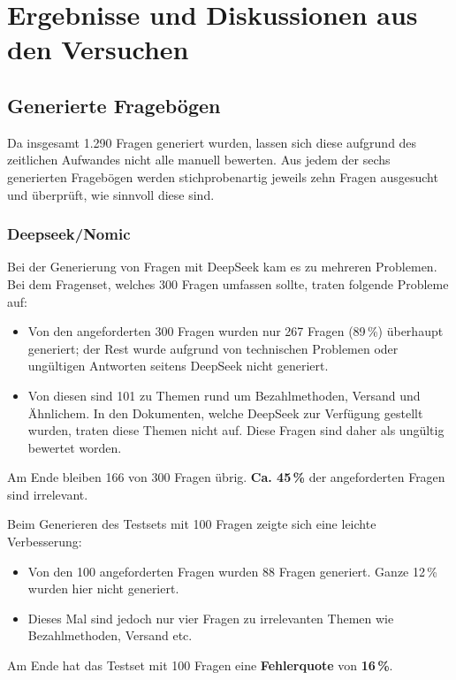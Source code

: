 \chapter{Ergebnisse und Diskussionen aus den Versuchen}



\section{Generierte Fragebögen}
Da insgesamt 1.290 Fragen generiert wurden, lassen sich diese aufgrund des zeitlichen Aufwandes nicht alle manuell bewerten. Aus jedem der sechs generierten Fragebögen werden stichprobenartig jeweils zehn Fragen ausgesucht und überprüft, wie sinnvoll diese sind.

\subsection{Deepseek/Nomic}

Bei der Generierung von Fragen mit DeepSeek kam es zu mehreren Problemen.
Bei dem Fragenset, welches 300 Fragen umfassen sollte, traten folgende Probleme auf:
\begin{itemize}
    \item Von den angeforderten 300 Fragen wurden nur 267 Fragen (89\,\%) überhaupt generiert; der Rest wurde aufgrund von technischen Problemen oder ungültigen Antworten seitens DeepSeek nicht generiert.
    \item Von diesen sind 101 zu Themen rund um Bezahlmethoden, Versand und Ähnlichem. In den Dokumenten, welche DeepSeek zur Verfügung gestellt wurden, traten diese Themen nicht auf. Diese Fragen sind daher als ungültig bewertet worden.
\end{itemize}

Am Ende bleiben 166 von 300 Fragen übrig. \textbf{Ca. 45\,\%} der angeforderten Fragen sind irrelevant.

Beim Generieren des Testsets mit 100 Fragen zeigte sich eine leichte Verbesserung:
\begin{itemize}
    \item Von den 100 angeforderten Fragen wurden 88 Fragen generiert. Ganze 12\,\% wurden hier nicht generiert.
    \item Dieses Mal sind jedoch nur vier Fragen zu irrelevanten Themen wie Bezahlmethoden, Versand etc.
\end{itemize}
Am Ende hat das Testset mit 100 Fragen eine \textbf{Fehlerquote} von \textbf{16\,\%}.

